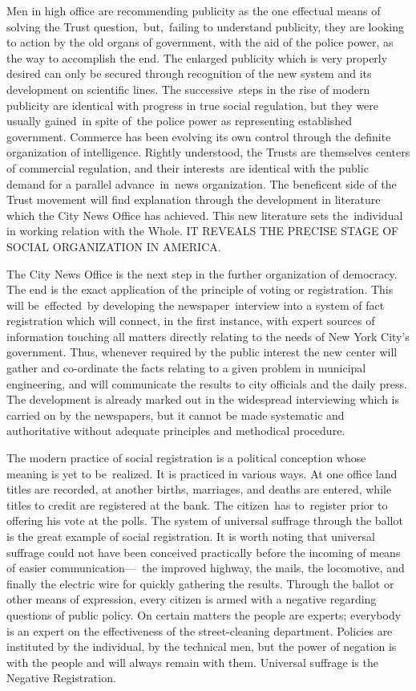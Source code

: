 \documentclass[twoside,symmetric,nobib,justified]{tufte-book}
\begin{document}
Men in high office are recommending publicity as the one effectual means
of solving the Trust question,~but,~failing to understand publicity,
they are looking to action by the old organs of government, with the aid
of the police power, as the way to accomplish the end. The enlarged
publicity which is very properly desired can only be secured through
recognition of the new system and its development on scientific lines.
The successive~steps in the rise of modern publicity are identical with
progress in true social regulation, but they were usually gained~in
spite of~the police power as representing established government.
Commerce has been evolving its own control through the definite
organization of intelligence. Rightly understood, the Trusts are
themselves centers of commercial regulation, and their interests~are
identical with the public demand for a parallel advance~in~news
organization. The beneficent side of the Trust movement will find
explanation through the development in literature which the City News
Office has achieved. This new literature sets the~individual in working
relation with the Whole. IT REVEALS THE PRECISE STAGE OF SOCIAL
ORGANIZATION IN AMERICA.~

\newpage The City News Office is the next step in the further organization of
democracy. The end is the exact application of the principle of voting
or registration. This will be~effected~by developing the
newspaper~interview into a system of fact registration which will
connect, in the first instance, with expert sources of information
touching all matters directly relating to the needs of New York City's
government. Thus, whenever required by the public interest the new
center will gather and co-ordinate the facts relating to a given problem
in municipal engineering, and will communicate the results to city
officials and the daily press. The development is already marked out in
the widespread interviewing which is carried on by the newspapers, but
it cannot be made systematic and authoritative without adequate
principles and methodical procedure.~

The modern practice of social registration is a political conception
whose meaning is yet to be~realized. It is practiced in various ways. At
one office land titles are recorded, at another births, marriages, and
deaths are entered, while titles to credit are registered at the bank.
The citizen~has to~register prior to offering his vote at the polls. The
system of universal suffrage through the ballot is the great example of
social registration. It is worth noting that universal suffrage could
not have been conceived practically before the incoming of means of
easier communication---~the improved highway, the mails, the locomotive,
and finally the electric wire for quickly gathering the results. Through
the ballot or other means of expression, every citizen is armed with a
negative regarding questions of public policy. On certain matters the
people are experts; everybody is an expert on the effectiveness of the
street-cleaning department. Policies are instituted by the individual,
by the technical men, but the power of negation is with the people and
will always remain with them. Universal suffrage is the Negative
Registration.~
\end{document}
